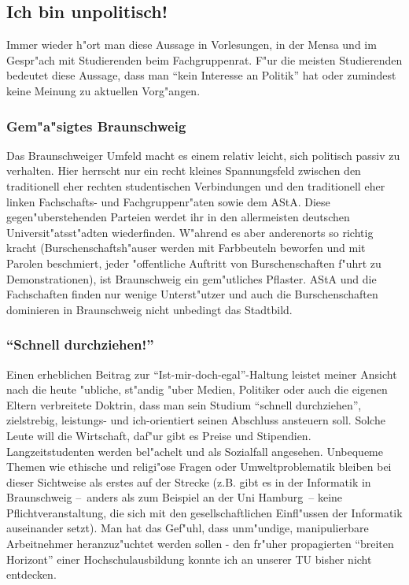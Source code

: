 \begin{multicols}{2}
\subsection{Ich bin unpolitisch!}
	Immer wieder h"ort man diese Aussage in Vorlesungen, in der Mensa und im Gespr"ach mit Studierenden beim Fachgruppenrat. F"ur die meisten Studierenden bedeutet diese Aussage, dass man "`kein Interesse an Politik"' hat oder zumindest keine Meinung zu aktuellen Vorg"angen.

\subsubsection*{Gem"a"sigtes Braunschweig}

Das Braunschweiger Umfeld macht es einem relativ leicht, sich politisch passiv 
zu verhalten. Hier herrscht nur ein recht kleines Spannungsfeld zwischen den 
traditionell eher rechten studentischen Verbindungen und den traditionell eher 
linken Fachschafts- und Fachgruppenr"aten sowie dem AStA. Diese 
gegen"uberstehenden Parteien werdet ihr in den allermeisten deutschen 
Universit"atsst"adten wiederfinden. W"ahrend es aber anderenorts so richtig 
kracht (Burschenschaftsh"auser werden mit Farbbeuteln beworfen und mit Parolen 
beschmiert, jeder "offentliche Auftritt von Burschenschaften f"uhrt zu 
Demonstrationen), ist Braunschweig ein gem"utliches Pflaster. AStA und die 
Fachschaften finden nur wenige Unterst"utzer und auch die Burschenschaften 
dominieren in Braunschweig nicht unbedingt das Stadtbild.

\subsubsection*{"`Schnell durchziehen!"'}

Einen erheblichen Beitrag zur "`Ist-mir-doch-egal"'-Haltung leistet meiner 
Ansicht nach die heute "ubliche, st"andig "uber Medien, Politiker oder auch die 
eigenen Eltern verbreitete Doktrin, dass man sein Studium "`schnell 
durchziehen"', zielstrebig, leistungs- und ich-orientiert seinen Abschluss 
ansteuern soll. Solche Leute will die Wirtschaft, daf"ur gibt es Preise und 
Stipendien. Langzeitstudenten werden bel"achelt und als Sozialfall angesehen. 
Unbequeme Themen wie ethische und religi"ose Fragen oder Umweltproblematik 
bleiben bei dieser Sichtweise als erstes auf der Strecke (z.B. gibt es in der 
Informatik in Braunschweig --~anders als zum Beispiel an der Uni Hamburg~-- 
keine Pflichtveranstaltung, die sich mit den gesellschaftlichen Einfl"ussen der 
Informatik auseinander setzt). Man hat das Gef"uhl, dass unm"undige, 
manipulierbare Arbeitnehmer heranzuz"uchtet werden sollen - den fr"uher 
propagierten "`breiten Horizont"' einer Hochschulausbildung konnte ich an 
unserer TU bisher nicht entdecken.


\end{multicols}
